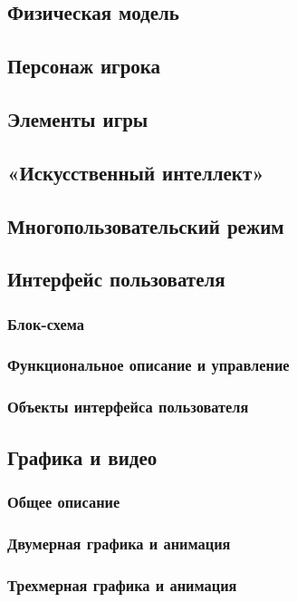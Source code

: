 \documentclass{article}
\begin{document}
    \subsection{Физическая модель}
    \subsection{Персонаж игрока}
    \subsection{Элементы игры}
    \subsection{«Искусственный интеллект»}
    \subsection{Многопользовательский режим}
    \subsection{Интерфейс пользователя}
        \subsubsection{Блок-схема}
        \subsubsection{Функциональное описание и управление}
        \subsubsection{Объекты интерфейса пользователя}
    \subsection{Графика и видео}
        \subsubsection{Общее описание}
        \subsubsection{Двумерная графика и анимация}
        \subsubsection{Трехмерная графика и анимация}
\end{document}
